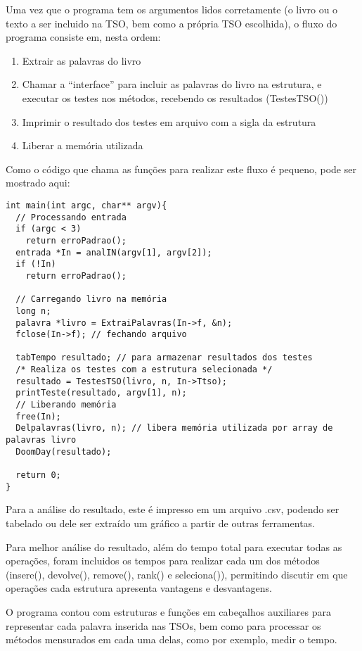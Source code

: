 \documentclass[a4paper]{article}
\begin{document}
Uma vez que o programa tem os argumentos lidos corretamente (o livro ou o texto a ser incluido na TSO, bem como a própria TSO escolhida), o fluxo do programa consiste em, nesta ordem:

\begin{enumerate}
  \item Extrair as palavras do livro
  \item Chamar a ``interface'' para incluir as palavras do livro na estrutura, e executar os testes nos métodos, recebendo os resultados (TestesTSO())
  \item Imprimir o resultado dos testes em arquivo com a sigla da estrutura
  \item Liberar a memória utilizada
\end{enumerate}

Como o código que chama as funções para realizar este fluxo é pequeno, pode ser mostrado aqui:

\begin{verbatim}
int main(int argc, char** argv){
  // Processando entrada
  if (argc < 3)
    return erroPadrao();
  entrada *In = analIN(argv[1], argv[2]);
  if (!In)
    return erroPadrao();

  // Carregando livro na memória
  long n;
  palavra *livro = ExtraiPalavras(In->f, &n);
  fclose(In->f); // fechando arquivo
  
  tabTempo resultado; // para armazenar resultados dos testes
  /* Realiza os testes com a estrutura selecionada */
  resultado = TestesTSO(livro, n, In->Ttso);
  printTeste(resultado, argv[1], n);
  // Liberando memória
  free(In);
  Delpalavras(livro, n); // libera memória utilizada por array de palavras livro
  DoomDay(resultado);
  
  return 0;
}
\end{verbatim}


Para a análise do resultado, este é impresso em um arquivo .csv, podendo ser tabelado ou dele ser extraído um gráfico a partir de outras ferramentas.

Para melhor análise do resultado, além do tempo total para executar todas as operações, foram incluidos os tempos para realizar cada um dos métodos (insere(), devolve(), remove(), rank() e seleciona()), permitindo discutir em que operações cada estrutura apresenta vantagens e desvantagens.

O programa contou com estruturas e funções em cabeçalhos auxiliares para representar cada palavra inserida nas TSOs, bem como para processar os métodos mensurados em cada uma delas, como por exemplo, medir o tempo.
\end{document}
